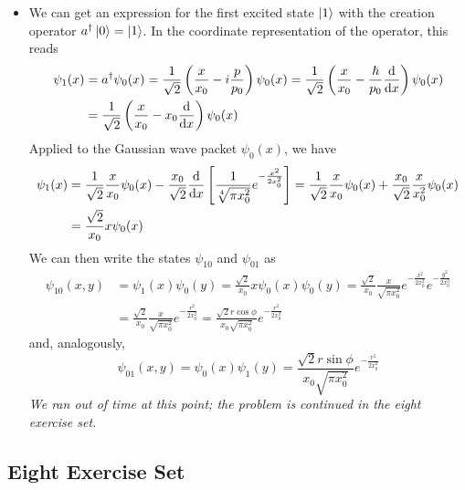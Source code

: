 \documentclass[11pt, a4paper]{article}
\begin{document}
\begin{itemize}
	\item We can get an expression for the first excited state $ \ket{1} $ with the creation operator $ a^{\dagger}\ket{0} = \ket{1} $. In the coordinate representation of the operator, this reads
	\begin{align*}
		\psi_{1}(x) &= a^{\dagger}\psi_{0}(x) = \frac{1}{\sqrt{2}}\left(\frac{x}{x_{0}}-i\frac{p}{p_{0}}\right)\psi_{0}(x)  = \frac{1}{\sqrt{2}}\left(\frac{x}{x_{0}}-\frac{\hbar}{p_{0}}\dv{x}\right)\psi_{0}(x) \\
		& = \frac{1}{\sqrt{2}}\left(\frac{x}{x_{0}}-x_{0}\dv{x}\right)\psi_{0}(x)
	\end{align*}
	Applied to the Gaussian wave packet $ \psi_{0}(x) $, we have
	\begin{align*}
		\psi_{1}(x) &= \frac{1}{\sqrt{2}}\frac{x}{x_{0}}\psi_{0}(x) - \frac{x_{0}}{\sqrt{2}}\dv{x}\left[\frac{1}{\sqrt[4]{\pi x_{0}^{2}}}e^{-\frac{x^{2}}{2x_{0}^{2}}}\right] = \frac{1}{\sqrt{2}}\frac{x}{x_{0}}\psi_{0}(x) + \frac{x_{0}}{\sqrt{2}}\frac{x}{x_{0}^{2}}\psi_{0}(x)\\
		&=\frac{\sqrt{2}}{x_{0}}x\psi_{0}(x)
	\end{align*}
	We can then write the states $ \psi_{10} $ and $ \psi_{01} $ as
	\begin{align*}
		\psi_{10}(x, y) &= \psi_{1}(x)\psi_{0}(y) = \frac{\sqrt{2}}{x_{0}}x\psi_{0}(x)\psi_{0}(y) = \frac{\sqrt{2}}{x_{0}} \frac{x}{\sqrt{\pi x_{0}^{2}}}e^{-\frac{x^{2}}{2x_{0}^{2}}} e^{-\frac{y^{2}}{2x_{0}^{2}}}\\
		&=\frac{\sqrt{2}}{x_{0}}\frac{x}{\sqrt{\pi x_{0}^{2}}} e^{-\frac{r^{2}}{2x_{0}^{2}}} = \frac{\sqrt{2}r \cos \phi}{x_{0}\sqrt{\pi x_{0}^{2}}}e^{-\frac{r^{2}}{2x_{0}^{2}}}
	\end{align*}
	and, analogously, 
	\begin{equation*}
		\psi_{01}(x, y) = \psi_{0}(x)\psi_{1}(y) = \frac{\sqrt{2}r \sin \phi}{x_{0}\sqrt{\pi x_{0}^{2}}}e^{-\frac{r^{2}}{2x_{0}^{2}}}
	\end{equation*}
	\textit{We ran out of time at this point; the problem is continued in the eight exercise set.}
	
\end{itemize}

\subsection{Eight Exercise Set}
\end{document}
